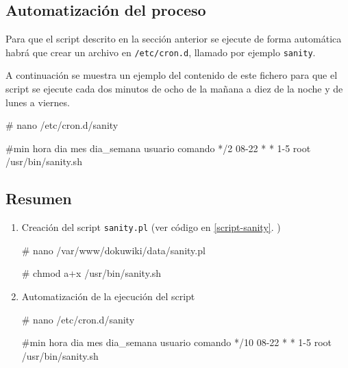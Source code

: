 \subsection{Automatización del proceso}

Para que el script descrito en la sección anterior se ejecute de forma automática habrá que crear un archivo en \texttt{/etc/cron.d}, llamado por ejemplo \texttt{sanity}.

A continuación se muestra un ejemplo del contenido de este fichero para que el script se ejecute cada dos minutos de ocho de la mañana a diez de la noche y de lunes a viernes.

\begin{listing}[style=consola, numbers=none]
# nano /etc/cron.d/sanity
\end{listing}

\begin{listing}
#min hora dia mes dia_semana usuario comando
*/2 08-22 * * 1-5 root /usr/bin/sanity.sh
\end{listing}

\newpage
\subsection{Resumen}

\begin{enumerate}
 \item  Creación del script \texttt{sanity.pl} (ver código en \ref{script-sanity}. )
\begin{listing}[style=consola, numbers=none]
# nano /var/www/dokuwiki/data/sanity.pl
\end{listing}

\begin{listing}[style=consola, numbers=none]
 # chmod a+x /usr/bin/sanity.sh
\end{listing}

\item Automatización de la ejecución del script

\begin{listing}[style=consola, numbers=none]
 # nano /etc/cron.d/sanity
\end{listing}

\begin{listing}[style=archivo, numbers=none]
 #min hora dia mes dia_semana usuario comando
*/10 08-22 * * 1-5 root /usr/bin/sanity.sh
\end{listing}

\end{enumerate}